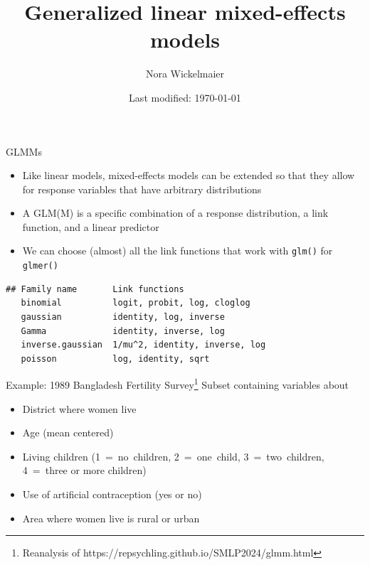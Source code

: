 \documentclass[aspectratio=169]{beamer}
\title{Generalized linear mixed-effects models}
\author{Nora Wickelmaier}
\date{Last modified: \today}
\begin{document}
\begin{frame}{}
\thispagestyle{empty}
\titlepage
\end{frame}


\begin{frame}[fragile]{GLMMs}
  \begin{itemize}
    \item Like linear models, mixed-effects models can be extended so that they
      allow for response variables that have arbitrary distributions
    \item A GLM(M) is a specific combination of a response distribution, a link
      function, and a linear predictor 
    \item We can choose (almost) all the link functions that work with
      \texttt{glm()} for \texttt{glmer()}
  \end{itemize}
\begin{lstlisting}
## Family name       Link functions
   binomial          logit, probit, log, cloglog
   gaussian          identity, log, inverse
   Gamma             identity, inverse, log
   inverse.gaussian  1/mu^2, identity, inverse, log
   poisson           log, identity, sqrt
\end{lstlisting}
\end{frame}

\begin{frame}{Example: 1989 Bangladesh Fertility Survey\footnote{Reanalysis of https://repsychling.github.io/SMLP2024/glmm.html}}
Subset containing variables about
  \begin{itemize}
    \item District where women live
    \item Age (mean centered)
    \item Living children (1~=~no~children, 2~=~one~child, 3~=~two~children,
      4~=~three or more children)
    \item Use of artificial contraception (yes or no)
    \item Area where women live is rural or urban
  \end{itemize}
\end{frame}
\end{document}
